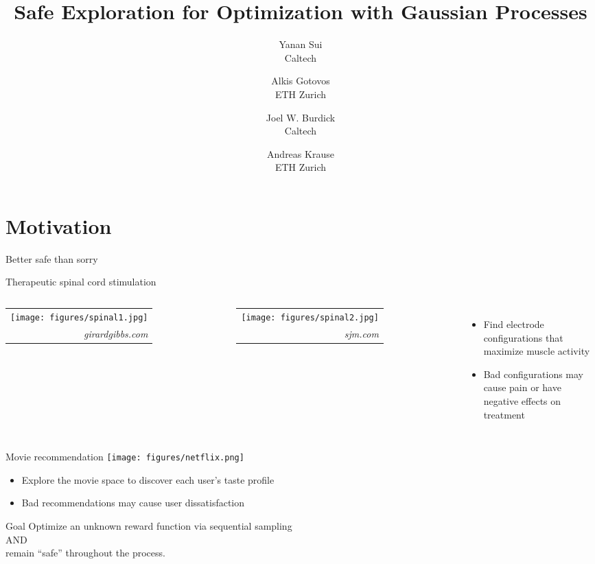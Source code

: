 \documentclass[xetex,10pt,mathserif,handout]{beamer}
\title[Safe Gaussian Process Optimization]
{Safe Exploration for Optimization with Gaussian Processes}
\author[Alkis Gotovos]{
\vspace{1in}
\normalsize
\parbox{1in}{Yanan Sui\\{\footnotesize Caltech}}\and
\parbox{1in}{Alkis Gotovos\\{\footnotesize ETH Zurich}}\and
\parbox{1in}{Joel W. Burdick\\{\footnotesize Caltech}}\and
\parbox{1in}{Andreas Krause\\{\footnotesize ETH Zurich}}
}
\date[May 4, 2015]{
\begin{center}
{\normalsize
ICML '15
}
\end{center}
}
\newcommand{\sig}[2]{%
\begin{tabular}{r}
#1\\[-0.7em]
{\tiny \color{darkgray}\it #2\hspace{0.5em}}
\end{tabular}}
\begin{document}


\section{Motivation}

\begin{frame}{Better safe than sorry}
\end{frame}

\begin{frame}{Therapeutic spinal cord stimulation}
\begin{columns}[c]
\centering
\sig{\texttt{[image: figures/spinal1.jpg]}}{girardgibbs.com}

\centering
\sig{\texttt{[image: figures/spinal2.jpg]}}{sjm.com}
\begin{itemize}
\item Find electrode configurations that maximize muscle activity
\item Bad configurations may cause pain or have negative effects on treatment
\end{itemize}
\end{columns}
\end{frame}

\begin{frame}{Movie recommendation}
\centering
\texttt{[image: figures/netflix.png]}
\vspace{2em}
\begin{itemize}
\item Explore the movie space to discover each user's taste profile
\item Bad recommendations may cause user dissatisfaction
\end{itemize}
\end{frame}

\begin{frame}{Goal}
\centering
\large
Optimize an unknown reward function via sequential sampling\\[1em]
AND\\[1em]
remain ``safe'' throughout the process.
\end{frame}
\end{document}
